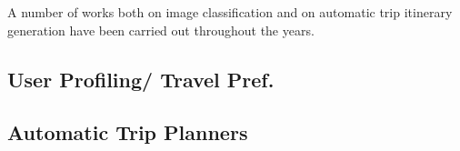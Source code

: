 A number of works both on image classification and on automatic trip
itinerary generation have been carried out throughout the years.

\subsection{User Profiling/ Travel Pref.}


\subsection{Automatic Trip Planners}